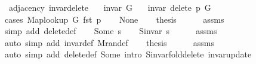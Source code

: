 \begin{isabellebody}
\isanewline
{}\isamarkupfalse%
\ {\isacharparenleft}{\kern0pt}\ adjacency{\isacharparenright}{\kern0pt}\ invar{\isacharunderscore}{\kern0pt}delete{\isacharunderscore}{\kern0pt}{}{\isacharcolon}{\kern0pt}\isanewline
\ \ \ {\isachardoublequoteopen}invar\ G{\isachardoublequoteclose}\isanewline
\ \ \ {\isachardoublequoteopen}invar\ {\isacharparenleft}{\kern0pt}delete{\isacharunderscore}{\kern0pt}{}\ p\ G{\isacharparenright}{\kern0pt}{\isachardoublequoteclose}\isanewline
%
\isadelimproof
%
\endisadelimproof
%
\isatagproof
{}\isamarkupfalse%
\ {\isacharparenleft}{\kern0pt}cases\ {\isachardoublequoteopen}Map{\isacharunderscore}{\kern0pt}lookup\ G\ {\isacharparenleft}{\kern0pt}fst\ p{\isacharparenright}{\kern0pt}{\isachardoublequoteclose}{\isacharparenright}{\kern0pt}\isanewline
\ \ \isamarkupfalse%
\ None\isanewline
\ \ \isamarkupfalse%
\ {\isacharquery}{\kern0pt}thesis\isanewline
\ \ \ \ \isamarkupfalse%
\ assms\isanewline
\ \ \ \ \isamarkupfalse%
\ {\isacharparenleft}{\kern0pt}simp\ add{\isacharcolon}{\kern0pt}\ delete{\isacharunderscore}{\kern0pt}{}{\isacharunderscore}{\kern0pt}def{\isacharparenright}{\kern0pt}\isanewline
{}\isamarkupfalse%
\isanewline
\ \ \isamarkupfalse%
\ {\isacharparenleft}{\kern0pt}Some\ s{\isacharparenright}{\kern0pt}\isanewline
\ \ \isamarkupfalse%
\ {\isachardoublequoteopen}S{\isachardot}{\kern0pt}invar\ s{\isachardoublequoteclose}\isanewline
\ \ \ \ \isamarkupfalse%
\ assms\isanewline
\ \ \ \ \isamarkupfalse%
\ {\isacharparenleft}{\kern0pt}auto\ simp\ add{\isacharcolon}{\kern0pt}\ invar{\isacharunderscore}{\kern0pt}def\ M{\isachardot}{\kern0pt}ran{\isacharunderscore}{\kern0pt}def{\isacharparenright}{\kern0pt}\isanewline
\ \ \isamarkupfalse%
\ {\isacharquery}{\kern0pt}thesis\isanewline
\ \ \ \ \isamarkupfalse%
\ assms\isanewline
\ \ \ \ \isamarkupfalse%
\ {\isacharparenleft}{\kern0pt}auto\ simp\ add{\isacharcolon}{\kern0pt}\ delete{\isacharunderscore}{\kern0pt}{}{\isacharunderscore}{\kern0pt}def\ Some\ intro{\isacharcolon}{\kern0pt}\ S{\isachardot}{\kern0pt}invar{\isacharunderscore}{\kern0pt}fold{\isacharunderscore}{\kern0pt}delete\ invar{\isacharunderscore}{\kern0pt}update{\isacharparenright}{\kern0pt}\isanewline
{}\isamarkupfalse%
%
\endisatagproof
{\isafoldproof}%
%
\isadelimproof
\isanewline

\end{isabellebody}
